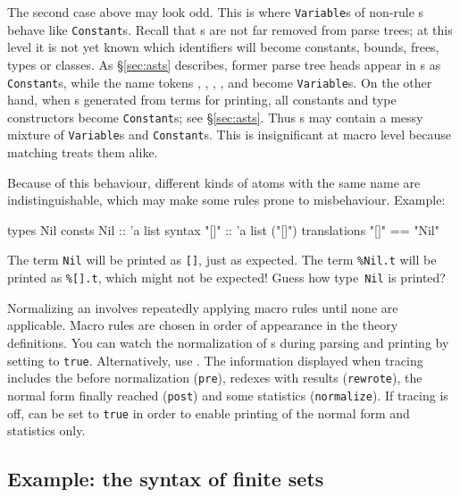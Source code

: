 The second case above may look odd.  This is where {\tt Variable}s of
non-rule \AST{}s behave like {\tt Constant}s.  Recall that \AST{}s are not
far removed from parse trees; at this level it is not yet known which
identifiers will become constants, bounds, frees, types or classes.  As
\S\ref{sec:asts} describes, former parse tree heads appear in \AST{}s as
{\tt Constant}s, while the name tokens , , ,
,  and  become {\tt Variable}s.  On the other
hand, when \AST{}s generated from terms for printing, all constants and type
constructors become {\tt Constant}s; see \S\ref{sec:asts}.  Thus \AST{}s may
contain a messy mixture of {\tt Variable}s and {\tt Constant}s.  This is
insignificant at macro level because matching treats them alike.

Because of this behaviour, different kinds of atoms with the same name are
indistinguishable, which may make some rules prone to misbehaviour.  Example:
\begin{ttbox}
types
  Nil
consts
  Nil     :: 'a list
syntax
  "[]"    :: 'a list    ("[]")
translations
  "[]"    == "Nil"
\end{ttbox}
The term {\tt Nil} will be printed as {\tt []}, just as expected.
The term \verb|%Nil.t| will be printed as \verb|%[].t|, which might not be
expected!  Guess how type~{\tt Nil} is printed?

Normalizing an \AST{} involves repeatedly applying macro rules until
none are applicable.  Macro rules are chosen in order of appearance in
the theory definitions.  You can watch the normalization of \AST{}s
during parsing and printing by setting 
to {\tt true}. Alternatively, use
.  The information displayed when tracing
includes the \AST{} before normalization ({\tt pre}), redexes with
results ({\tt rewrote}), the normal form finally reached ({\tt post})
and some statistics ({\tt normalize}).  If tracing is off,
 can be set to {\tt true} in order to
enable printing of the normal form and statistics only.


\subsection{Example: the syntax of finite sets}

